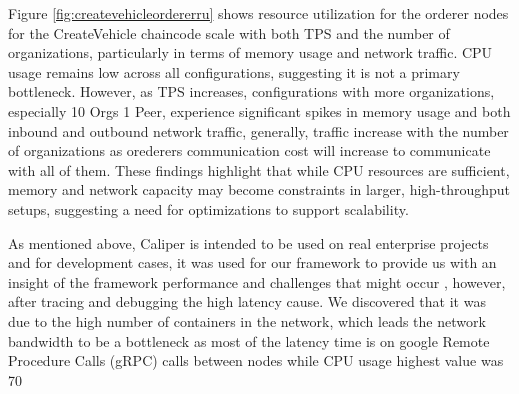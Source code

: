Figure \ref{fig:createvehicleordererru}
shows resource utilization for the orderer nodes for the CreateVehicle chaincode scale with both TPS and the number of
organizations, particularly in terms of memory usage and network traffic. CPU usage remains low across all configurations, suggesting it is
not a primary bottleneck. However, as TPS increases, configurations with more organizations, especially 10 Orgs 1 Peer, experience
significant spikes in memory usage and both inbound and outbound network traffic, generally, traffic increase with the number of
organizations as orederers communication cost will increase to communicate with all of them. These findings highlight that while CPU
resources are sufficient, memory and network capacity may become constraints in larger, high-throughput setups, suggesting a need for
optimizations to support scalability.

As mentioned above, Caliper is intended to be used on real enterprise projects and for development cases, it
was used for our framework to provide us with an insight of the framework performance and challenges that might occur
, however, after tracing and debugging the high latency cause. We discovered that it was due to the high
number of containers in the network, which leads the network bandwidth to be a bottleneck as most of the
latency time is on google Remote Procedure Calls (gRPC) calls between nodes while CPU usage highest value was 70%

